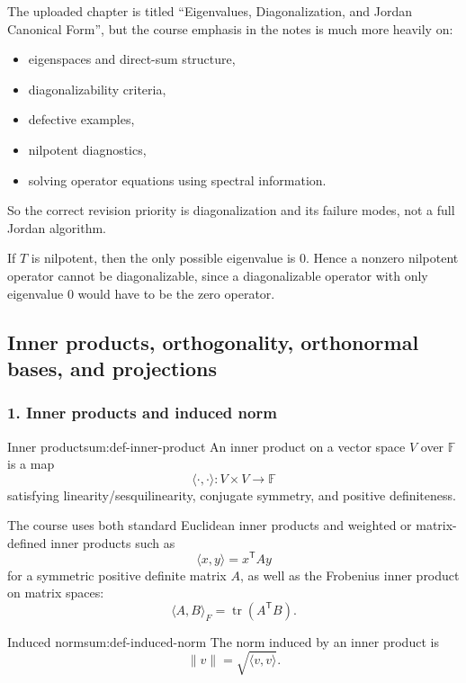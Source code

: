 The uploaded chapter is titled ``Eigenvalues, Diagonalization, and Jordan Canonical Form'', but the course emphasis in the notes is much more heavily on:
\begin{itemize}[leftmargin=*]
    \item eigenspaces and direct-sum structure,
    \item diagonalizability criteria,
    \item defective examples,
    \item nilpotent diagnostics,
    \item solving operator equations using spectral information.
\end{itemize}
So the correct revision priority is diagonalization and its failure modes, not a full Jordan algorithm.

\begin{examtip}[title={Exam Focus: nilpotent operators}]
If \(T\) is nilpotent, then the only possible eigenvalue is \(0\). Hence a nonzero nilpotent operator cannot be diagonalizable, since a diagonalizable operator with only eigenvalue \(0\) would have to be the zero operator.
\end{examtip}

\subsection{Inner products, orthogonality, orthonormal bases, and projections}

\subsubsection*{1. Inner products and induced norm}

\begin{definition}{Inner product}{sum:def-inner-product}
An inner product on a vector space \(V\) over \(\mathbb{F}\) is a map
\[
\langle \cdot,\cdot\rangle : V\times V \to \mathbb{F}
\]
satisfying linearity/sesquilinearity, conjugate symmetry, and positive definiteness.
\end{definition}

The course uses both standard Euclidean inner products and weighted or matrix-defined inner products such as
\[
\langle x,y\rangle = x^{\mathsf T}Ay
\]
for a symmetric positive definite matrix \(A\), as well as the Frobenius inner product on matrix spaces:
\[
\langle A,B\rangle_F = \operatorname{tr}(A^{\mathsf T}B).
\]

\begin{definition}{Induced norm}{sum:def-induced-norm}
The norm induced by an inner product is
\[
\|v\|=\sqrt{\langle v,v\rangle}.
\]
\end{definition}

